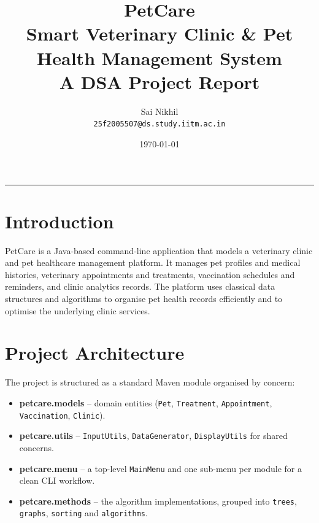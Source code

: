 \documentclass[11pt,a4paper]{article}
\title{\textbf{PetCare}\\Smart Veterinary Clinic \& Pet Health Management System\\\large A DSA Project Report}
\author{Sai Nikhil \\ \texttt{25f2005507@ds.study.iitm.ac.in}}
\date{\today}
\begin{document}
\maketitle
\hrule
\vspace{1em}

\section{Introduction}
PetCare is a Java-based command-line application that models a veterinary
clinic and pet healthcare management platform. It manages pet profiles and
medical histories, veterinary appointments and treatments, vaccination
schedules and reminders, and clinic analytics records. The platform uses
classical data structures and algorithms to organise pet health records
efficiently and to optimise the underlying clinic services.

\section{Project Architecture}
The project is structured as a standard Maven module organised by concern:
\begin{itemize}[noitemsep]
  \item \textbf{petcare.models} -- domain entities (\texttt{Pet},
        \texttt{Treatment}, \texttt{Appointment}, \texttt{Vaccination},
        \texttt{Clinic}).
  \item \textbf{petcare.utils} -- \texttt{InputUtils},
        \texttt{DataGenerator}, \texttt{DisplayUtils} for shared concerns.
  \item \textbf{petcare.menu} -- a top-level \texttt{MainMenu} and one
        sub-menu per module for a clean CLI workflow.
  \item \textbf{petcare.methods} -- the algorithm implementations,
        grouped into \texttt{trees}, \texttt{graphs}, \texttt{sorting} and
        \texttt{algorithms}.
\end{itemize}
\end{document}
